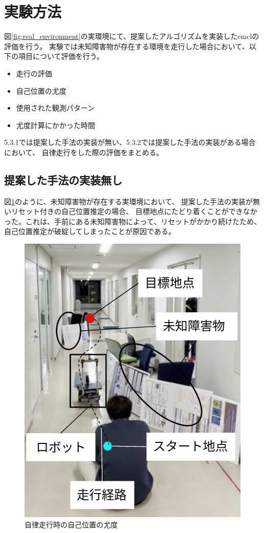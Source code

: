 \section{実験方法}

図\ref{fig:real_environment}の実環境にて、提案したアルゴリズムを実装したemclの評価を行う。
実験では未知障害物が存在する環境を走行した場合において、以下の項目について評価を行う。
\begin{itemize}
  \item 走行の評価
  \item 自己位置の尤度
  \item 使用された観測パターン
  \item 尤度計算にかかった時間
\end{itemize}
5.3.1では提案した手法の実装が無い、5.3.2では提案した手法の実装がある場合において、
自律走行をした際の評価をまとめる。

\subsection{提案した手法の実装無し}

図\ref{fig:nav_no_imp_real}のように、未知障害物が存在する実環境において、
提案した手法の実装が無いリセット付きの自己位置推定の場合、
目標地点にたどり着くことができなかった。これは、手前にある未知障害物によって、リセットがかかり続けたため、
自己位置推定が破綻してしまったことが原因である。

\begin{figure}[H]
  \begin{center}
    \includegraphics[width=0.5\linewidth]{figs/real_environment.png}
    \caption{自律走行時の自己位置の尤度}
    \label{fig:nav_no_imp_real}
  \end{center}
\end{figure}

